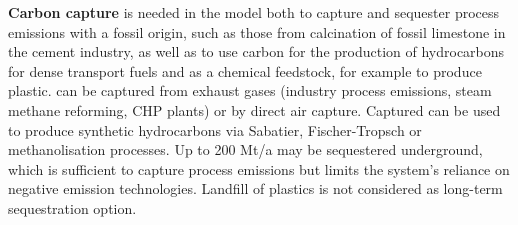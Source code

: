 \textbf{Carbon capture} is needed in the model both to capture and sequester
process emissions with a fossil origin, such as those from calcination of fossil
limestone in the cement industry, as well as to use carbon for the production of
hydrocarbons for dense transport fuels and as a chemical feedstock, for example
to produce plastic. \co can be captured from exhaust gases (industry process
emissions, steam methane reforming, CHP plants) or by direct air capture.
Captured \co can be used to produce synthetic hydrocarbons via Sabatier,
Fischer-Tropsch or methanolisation processes. Up to 200 Mt\co/a may be
sequestered underground, which is sufficient to capture process emissions but
limits the system's reliance on negative emission technologies. Landfill of
plastics is not considered as long-term sequestration option.
